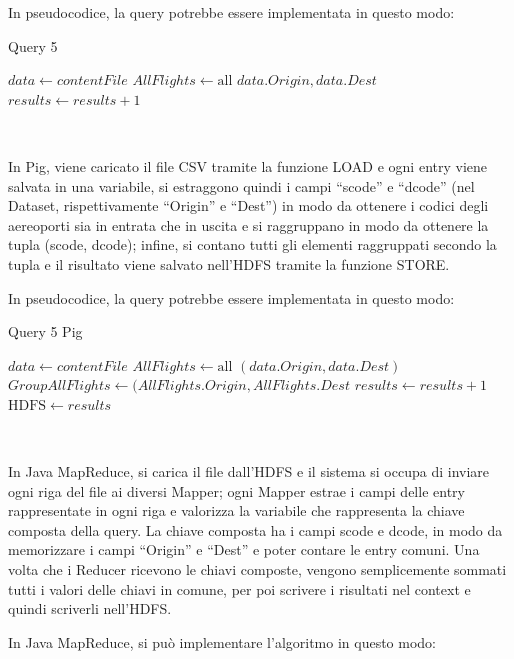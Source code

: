 \documentclass[11pt]{article} %
\begin{document}
In pseudocodice, la query potrebbe essere implementata in questo modo:

\begin{algorithm}
\caption{Query 5}\label{euclid}
\begin{algorithmic}[0]
\State $data \gets contentFile$
\State $AllFlights \gets \text{all } data.Origin, data.Dest$
\State $results \gets results + 1$
\EndFor
\end{algorithmic}
\end{algorithm}

~

In Pig, viene caricato il file CSV tramite la funzione LOAD e ogni entry viene salvata in una variabile, si estraggono quindi i campi ``scode'' e ``dcode'' (nel Dataset, rispettivamente ``Origin'' e ``Dest'') in modo da ottenere i codici degli aereoporti sia in entrata che in uscita e si raggruppano in modo da ottenere la tupla (scode, dcode); infine, si contano tutti gli elementi raggruppati secondo la tupla e il risultato viene salvato nell'HDFS tramite la funzione STORE.

In pseudocodice, la query potrebbe essere implementata in questo modo:

\begin{algorithm}
\caption{Query 5 Pig}\label{euclid}
\begin{algorithmic}[0]
\State $data \gets contentFile$
\State $AllFlights \gets \text{all } (data.Origin, data.Dest)$
\State $GroupAllFlights \gets (AllFlights.Origin, AllFlights.Dest$
	\State $results \gets results + 1$
\EndFor
\State $\text{HDFS}\gets results$
\end{algorithmic}
\end{algorithm}

~

In Java MapReduce, si carica il file dall'HDFS e il sistema si occupa di inviare ogni riga del file ai diversi Mapper; ogni Mapper estrae i campi delle entry rappresentate in ogni riga e valorizza la variabile che rappresenta la chiave composta della query. La chiave composta ha i campi scode e dcode, in modo da memorizzare i campi ``Origin'' e ``Dest'' e poter contare le entry comuni. Una volta che i Reducer ricevono le chiavi composte, vengono semplicemente sommati tutti i valori delle chiavi in comune, per poi scrivere i risultati nel context e quindi scriverli nell'HDFS.

In Java MapReduce, si può implementare l'algoritmo in questo modo:
\end{document}
